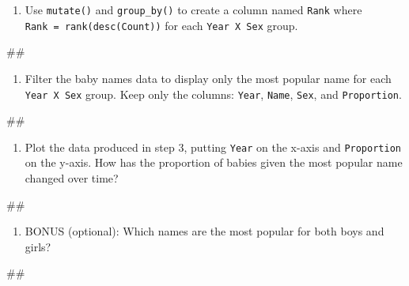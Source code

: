 \documentclass[]{book}
\newenvironment{Shaded}{\begin{snugshade}}{\end{snugshade}}
\newcommand{\NormalTok}[1]{#1}
\providecommand{\tightlist}{%
  \setlength{\itemsep}{0pt}\setlength{\parskip}{0pt}}
\begin{document}
\begin{enumerate}
\def\labelenumi{\arabic{enumi}.}
\setcounter{enumi}{1}
\tightlist
\item
  Use \texttt{mutate()} and \texttt{group\_by()} to create a column
  named \texttt{Rank} where \texttt{Rank\ =\ rank(desc(Count))} for each
  \texttt{Year\ X\ Sex} group.
\end{enumerate}

\begin{Shaded}
\begin{Highlighting}[]
\NormalTok{##}
\end{Highlighting}
\end{Shaded}

\begin{enumerate}
\def\labelenumi{\arabic{enumi}.}
\setcounter{enumi}{2}
\tightlist
\item
  Filter the baby names data to display only the most popular name for
  each \texttt{Year\ X\ Sex} group. Keep only the columns:
  \texttt{Year}, \texttt{Name}, \texttt{Sex}, and \texttt{Proportion}.
\end{enumerate}

\begin{Shaded}
\begin{Highlighting}[]
\NormalTok{##}
\end{Highlighting}
\end{Shaded}

\begin{enumerate}
\def\labelenumi{\arabic{enumi}.}
\setcounter{enumi}{3}
\tightlist
\item
  Plot the data produced in step 3, putting \texttt{Year} on the x-axis
  and \texttt{Proportion} on the y-axis. How has the proportion of
  babies given the most popular name changed over time?
\end{enumerate}

\begin{Shaded}
\begin{Highlighting}[]
\NormalTok{##}
\end{Highlighting}
\end{Shaded}

\begin{enumerate}
\def\labelenumi{\arabic{enumi}.}
\setcounter{enumi}{4}
\tightlist
\item
  BONUS (optional): Which names are the most popular for both boys and
  girls?
\end{enumerate}

\begin{Shaded}
\begin{Highlighting}[]
\NormalTok{##}
\end{Highlighting}
\end{Shaded}
\end{document}
